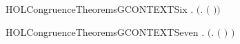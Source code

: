 \newcommand{\HOLCongruenceTheoremsGCONTEXTFive}{\UseVerbatim{HOLCongruenceTheoremsGCONTEXTFive}}
\begin{SaveVerbatim}{HOLCongruenceTheoremsGCONTEXTSix}
\HOLTokenTurnstile{} \HOLSymConst{\HOLTokenForall{}} .   \HOLSymConst{\HOLTokenImp{}}  \ensuremath{(}\HOLTokenLambda{}.   \ensuremath{(} \ensuremath{)}\ensuremath{)}
\end{SaveVerbatim}
\newcommand{\HOLCongruenceTheoremsGCONTEXTSix}{\UseVerbatim{HOLCongruenceTheoremsGCONTEXTSix}}
\begin{SaveVerbatim}{HOLCongruenceTheoremsGCONTEXTSeven}
\HOLTokenTurnstile{} \HOLSymConst{\HOLTokenForall{}} .   \HOLSymConst{\HOLTokenImp{}}  \ensuremath{(}\HOLTokenLambda{}.  \ensuremath{(} \ensuremath{)} \ensuremath{)}
\end{SaveVerbatim}
\newcommand{\HOLCongruenceTheoremsGCONTEXTSeven}{\UseVerbatim{HOLCongruenceTheoremsGCONTEXTSeven}}
